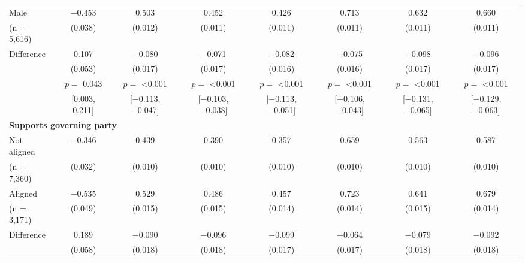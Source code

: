 \begin{tabular}[t]{lccccccc}
\hspace{1em} Male & \num{-0.453} & \num{0.503} & \num{0.452} & \num{0.426} & \num{0.713} & \num{0.632} & \num{0.660}\\
\hspace{2em}(n = 5,616) & (\num{0.038}) & (\num{0.012}) & (\num{0.011}) & (\num{0.011}) & (\num{0.011}) & (\num{0.011}) & (\num{0.011})\\\cmidrule(lr){2-8}
\hspace{1em} Difference & \num{0.107} & \num{-0.080} & \num{-0.071} & \num{-0.082} & \num{-0.075} & \num{-0.098} & \num{-0.096}\\
\hspace{2em} & (\num{0.053}) & (\num{0.017}) & (\num{0.017}) & (\num{0.016}) & (\num{0.016}) & (\num{0.017}) & (\num{0.017})\\
 & $p =$ \num{0.043} & $p =$ \num{<0.001} & $p =$ \num{<0.001} & $p =$ \num{<0.001} & $p =$ \num{<0.001} & $p =$ \num{<0.001} & $p =$ \num{<0.001}\\
 & {}[\num{0.003}, \num{0.211}] & {}[\num{-0.113}, \num{-0.047}] & {}[\num{-0.103}, \num{-0.038}] & {}[\num{-0.113}, \num{-0.051}] & {}[\num{-0.106}, \num{-0.043}] & {}[\num{-0.131}, \num{-0.065}] & {}[\num{-0.129}, \num{-0.063}]\\\multicolumn{4}{l}{\textbf{Supports governing party}} \rule{0pt}{1.2\normalbaselineskip}\\
\hspace{1em} Not aligned & \num{-0.346} & \num{0.439} & \num{0.390} & \num{0.357} & \num{0.659} & \num{0.563} & \num{0.587}\\
\hspace{2em}(n = 7,360) & (\num{0.032}) & (\num{0.010}) & (\num{0.010}) & (\num{0.010}) & (\num{0.010}) & (\num{0.010}) & (\num{0.010})\\
\hspace{1em} Aligned & \num{-0.535} & \num{0.529} & \num{0.486} & \num{0.457} & \num{0.723} & \num{0.641} & \num{0.679}\\
\hspace{2em}(n = 3,171) & (\num{0.049}) & (\num{0.015}) & (\num{0.015}) & (\num{0.014}) & (\num{0.014}) & (\num{0.015}) & (\num{0.014})\\\cmidrule(lr){2-8}
\hspace{1em} Difference & \num{0.189} & \num{-0.090} & \num{-0.096} & \num{-0.099} & \num{-0.064} & \num{-0.079} & \num{-0.092}\\
\hspace{2em} & (\num{0.058}) & (\num{0.018}) & (\num{0.018}) & (\num{0.017}) & (\num{0.017}) & (\num{0.018}) & (\num{0.018})\\

\end{tabular}
